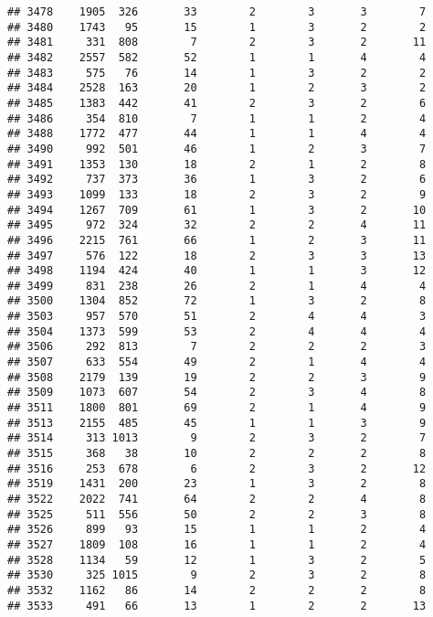 \documentclass[]{article}
\begin{document}
\begin{verbatim}
## 3478    1905  326       33        2        3       3        7
## 3480    1743   95       15        1        3       2        2
## 3481     331  808        7        2        3       2       11
## 3482    2557  582       52        1        1       4        4
## 3483     575   76       14        1        3       2        2
## 3484    2528  163       20        1        2       3        2
## 3485    1383  442       41        2        3       2        6
## 3486     354  810        7        1        1       2        4
## 3488    1772  477       44        1        1       4        4
## 3490     992  501       46        1        2       3        7
## 3491    1353  130       18        2        1       2        8
## 3492     737  373       36        1        3       2        6
## 3493    1099  133       18        2        3       2        9
## 3494    1267  709       61        1        3       2       10
## 3495     972  324       32        2        2       4       11
## 3496    2215  761       66        1        2       3       11
## 3497     576  122       18        2        3       3       13
## 3498    1194  424       40        1        1       3       12
## 3499     831  238       26        2        1       4        4
## 3500    1304  852       72        1        3       2        8
## 3503     957  570       51        2        4       4        3
## 3504    1373  599       53        2        4       4        4
## 3506     292  813        7        2        2       2        3
## 3507     633  554       49        2        1       4        4
## 3508    2179  139       19        2        2       3        9
## 3509    1073  607       54        2        3       4        8
## 3511    1800  801       69        2        1       4        9
## 3513    2155  485       45        1        1       3        9
## 3514     313 1013        9        2        3       2        7
## 3515     368   38       10        2        2       2        8
## 3516     253  678        6        2        3       2       12
## 3519    1431  200       23        1        3       2        8
## 3522    2022  741       64        2        2       4        8
## 3525     511  556       50        2        2       3        8
## 3526     899   93       15        1        1       2        4
## 3527    1809  108       16        1        1       2        4
## 3528    1134   59       12        1        3       2        5
## 3530     325 1015        9        2        3       2        8
## 3532    1162   86       14        2        2       2        8
## 3533     491   66       13        1        2       2       13

\end{verbatim}
\end{document}
